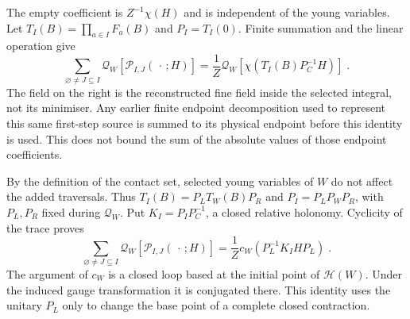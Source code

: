 \documentclass[11pt]{article}
\begin{document}
The empty coefficient is $Z^{-1}\chi(H)$ and is independent of
the young variables. Let $T_I(B)=\prod_{a\in I}F_a(B)$ and
$P_I=T_I(0)$. Finite summation and the linear operation give
\begin{equation}\label{eq:c8-fourth-local-resum}
    \sum_{\varnothing\neq J\subseteq I}
        \mathscr Q_W[\mathcal P_{I,J}(\,\cdot\,;H)]
        =\frac{1}{Z}\mathscr Q_W[
            \chi(T_I(B)P_C^{-1}H)]\;.
\end{equation}
The field on the right is the reconstructed fine field inside
the selected integral, not its minimiser. Any earlier finite
endpoint decomposition used to represent this same first-step
source is summed to its physical endpoint before this identity
is used. This does not bound the sum of the absolute values of
those endpoint coefficients.

By the definition of the contact set, selected young variables of
$W$ do not affect the added traversals. Thus
$T_I(B)=P_L T_W(B)P_R$ and $P_I=P_LP_WP_R$, with $P_L,P_R$
fixed during $\mathscr Q_W$. Put $K_I=P_IP_C^{-1}$, a closed
relative holonomy. Cyclicity of the trace proves
\begin{equation}\label{eq:c8-fourth-seed-identification}
    \sum_{\varnothing\neq J\subseteq I}
        \mathscr Q_W[\mathcal P_{I,J}(\,\cdot\,;H)]
        =\frac{1}{Z}c_W(P_L^{-1}K_IHP_L)\;.
\end{equation}
The argument of $c_W$ is a closed loop based at the initial
point of $\mathcal H(W)$. Under the induced gauge transformation
it is conjugated there. This identity uses the unitary $P_L$
only to change the base point of a complete closed contraction.
\end{document}
